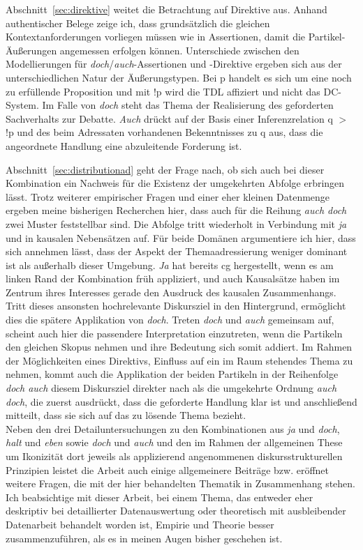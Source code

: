 Abschnitt~\ref{sec:direktive} weitet die Betrachtung auf Direktive  aus. Anhand authentischer Belege zeige ich, dass grundsätzlich die gleichen Kontextanforderungen vorliegen müssen wie in Assertionen, damit die Partikel-Äußerungen angemessen erfolgen können. Unterschiede zwischen den Modellierungen für \textit{doch}/\textit{auch}-Asser\-tionen und -Direktive ergeben sich aus der unterschiedlichen Natur der Äußerungs\-typen. Bei p handelt es sich um eine noch zu erfüllende Proposition und mit !p wird die TDL affiziert und nicht das DC-System. Im Falle von \textit{doch} steht das Thema der Realisierung des geforderten Sachverhalts zur Debatte. \textit{Auch} drückt auf der Basis einer  Inferenzrelation q $>$ !p und des beim Adressaten vorhandenen Bekennt\-nisses zu q aus, dass die angeordnete Handlung eine abzuleitende Forderung ist. 

Abschnitt~\ref{sec:distributionad} geht der Frage nach, ob sich auch bei dieser Kombination ein Nachweis für die Existenz der umgekehrten Abfolge erbringen lässt. Trotz weiterer empirischer Fragen und einer eher kleinen Datenmenge ergeben meine bisherigen Recherchen hier, dass auch für die Reihung \textit{auch doch} zwei Muster feststellbar sind. Die Abfolge tritt wiederholt in Verbindung mit \textit{ja} und in kausalen Nebensätzen auf. Für beide Domänen argumentiere ich hier, dass sich annehmen lässt, dass der Aspekt der Themaadressierung weniger dominant ist als außerhalb dieser Umgebung. \textit{Ja} hat bereits cg hergestellt, wenn es am linken Rand der Kombination früh appliziert, und auch Kausalsätze haben im Zentrum ihres Interesses gerade den Ausdruck des kausalen Zusammenhangs. Tritt dieses ansonsten hochrelevante Diskursziel in den Hintergrund, ermöglicht dies die spätere Ap\-plikation von \textit{doch}. Treten \textit{doch} und \textit{auch} gemeinsam auf, scheint auch hier die passendere Interpretation einzutreten, wenn die Partikeln den gleichen Skopus  nehmen und ihre Bedeutung sich somit addiert. Im Rahmen der Möglichkeiten eines Direktivs, Einfluss auf ein im Raum stehendes Thema zu nehmen, kommt auch die Applikation der beiden Partikeln in der Reihenfolge \textit{doch auch} diesem Diskursziel direkter nach als die umgekehrte Ordnung \textit{auch doch}, die zuerst ausdrückt, dass die geforderte Handlung klar ist und anschließend mitteilt, dass sie sich auf das zu lösende Thema bezieht.\\

\noindent
Neben den drei Detailuntersuchungen zu den Kombinationen aus \textit{ja} und \textit{doch}, \textit{halt} und \textit{eben} sowie \textit{doch} und \textit{auch} und den im Rahmen der allgemeinen These um Ikonizität dort jeweils als applizierend angenommenen diskursstrukturellen Prinzipien leistet die Arbeit auch einige allgemeinere Beiträge bzw. eröffnet wei\-tere Fragen, die mit der hier behandelten Thematik in Zusammenhang stehen.\\
\noindent
Ich beabsichtige mit dieser Arbeit, bei einem Thema, das entweder eher deskriptiv bei detaillierter Datenauswertung oder theoretisch mit ausbleibender Datenar\-beit behandelt worden ist, Empirie und Theorie besser zusammenzuführen, als es in meinen Augen bisher geschehen ist. 

